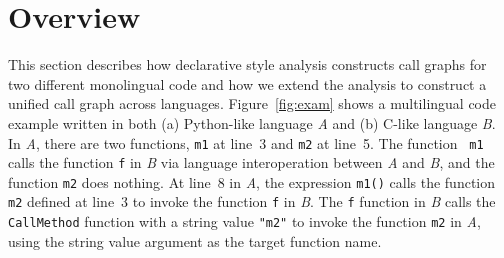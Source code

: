 
\section{Overview}

This section describes how declarative style analysis constructs call graphs
for two different monolingual code and how we extend the analysis to construct
a unified call graph across languages.
Figure~\ref{fig:exam} shows a multilingual code example written in both (a)
Python-like language {\it A} and (b) C-like language {\it B}. In {\it A}, there
are two functions, {\tt m1} at line~3 and {\tt m2} at line~5. The function {\tt
m1} calls the function {\tt f} in {\it B} via language interoperation between
{\it A} and {\it B}, and the function {\tt m2} does nothing. At line~8 in {\it
A}, the expression {\tt m1()} calls the function {\tt m2} defined at line~3 to
invoke the function {\tt f} in {\it B}.
The {\tt f} function in {\it B} calls the {\tt CallMethod} function with a
string value {\tt "m2"} to invoke the function {\tt m2} in {\it A}, using the
string value argument as the target function name.



